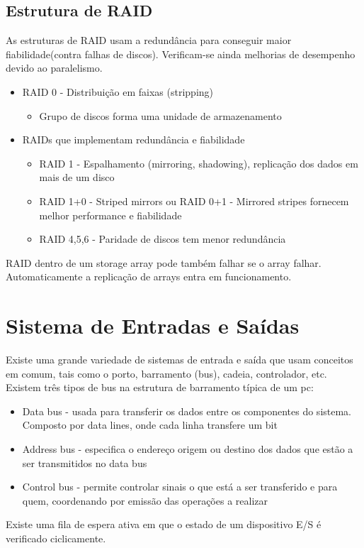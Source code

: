 \documentclass[10pt,a4paper]{report}
\begin{document}
\subsection{Estrutura de RAID}
As estruturas de RAID usam a redundância para conseguir maior fiabilidade(contra falhas de discos). Verificam-se ainda melhorias de desempenho devido ao paralelismo. 
\begin{itemize}
\item RAID 0 - Distribuição em faixas (stripping)
\begin{itemize}
\item Grupo de discos forma uma unidade de armazenamento
\end{itemize}
\item RAIDs que implementam redundância e fiabilidade
\begin{itemize}
\item RAID 1 - Espalhamento (mirroring, shadowing), replicação dos dados em mais de um disco
\item RAID 1+0 - Striped mirrors ou RAID 0+1 - Mirrored stripes fornecem melhor performance e fiabilidade
\item RAID 4,5,6 - Paridade de discos tem menor redundância
\end{itemize}
\end{itemize}
RAID dentro de um storage array pode também falhar se o array falhar.
Automaticamente a replicação de arrays entra em funcionamento.
\section{Sistema de Entradas e Saídas}
Existe uma grande variedade de sistemas de entrada e saída que usam conceitos em comum, tais como o porto, barramento (bus), cadeia, controlador, etc.\\
Existem três tipos de bus na estrutura de barramento típica de um pc:
\begin{itemize}
\item Data bus - usada para transferir
os dados entre os componentes do sistema. Composto por data lines, onde cada linha transfere um bit
\item Address bus - especifica o endereço origem ou destino dos dados que estão a ser transmitidos no data bus
\item Control bus - permite controlar sinais o que está a ser transferido e para quem, coordenando por emissão das operações a realizar
\end{itemize}
Existe uma fila de espera ativa em que o estado de um dispositivo E/S é verificado ciclicamente.
\end{document}
